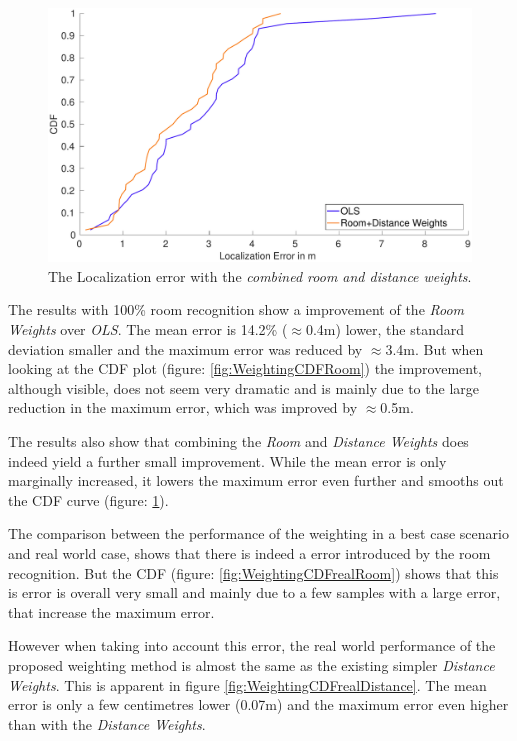 \begin{figure}[p]
\centering
\includegraphics[width=\textwidth]{Figures/WeightingCDF_RDW}
\decoRule
\caption[Weighting method comparison]{The Localization error with the \emph{combined room and distance weights}.}
\label{fig:WeightingCDFRoomDistance}
\end{figure}

The results with 100\% room recognition show a improvement of the \emph{Room Weights} over \emph{OLS}. The mean error is 14.2\% ($\approx$0.4m) lower, the standard deviation smaller and the maximum error was reduced by $\approx$3.4m. But when looking at the CDF plot (figure: \ref{fig:WeightingCDFRoom}) the improvement, although visible, does not seem very dramatic and is mainly due to the large reduction in the maximum error, which was improved by $\approx$0.5m.

The results also show that combining the \emph{Room} and \emph{Distance Weights} does indeed yield a further small improvement. While the mean error is only marginally increased, it lowers the maximum error even further and smooths out the CDF curve (figure: \ref{fig:WeightingCDFRoomDistance}).

The comparison between the performance of the weighting in a best case scenario and real world case, shows that there is indeed a error introduced by the room recognition. But the CDF (figure: \ref{fig:WeightingCDFrealRoom}) shows that this is error is overall very small and mainly due to a few samples with a large error, that increase the maximum error.

However when taking into account this error, the real world performance of the proposed weighting method is almost the same as the existing simpler \emph{Distance Weights}. This is apparent in figure \ref{fig:WeightingCDFrealDistance}. The mean error is only a few centimetres lower (0.07m) and the maximum error even higher than with the \emph{Distance Weights}.

